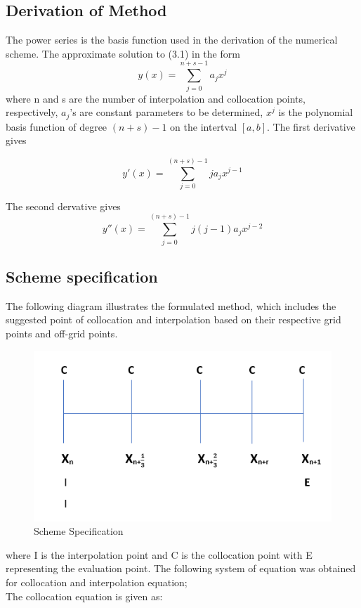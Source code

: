 \documentclass[12pt]{article}
\begin{document}
\subsection{Derivation of Method}
\noindent The power series is the basis function used in the derivation of the numerical scheme. The approximate solution to (3.1) in the form
	\begin{equation}
	y(x) = \sum_{j=0}^{n+s-1}a_{j}x^{j}								
	\end{equation}
	where n and s are the number of interpolation and collocation points, respectively, $a_j$'s are constant parameters to be determined, $x^j$ is the polynomial basis function of degree $(n+s)-1$ on the intertval $[a,b]$. The first derivative gives
	
	\begin{equation}
	y'(x)=\sum_{j=0}^{(n+s)-1} j a_{j}x^{j-1}
	\end{equation}
	
	The second dervative gives
	\begin{equation}
	y''(x)=\sum_{j=0}^{(n+s)-1} j(j-1) a_{j}x^{j-2}
	\end{equation}
	
\subsection{Scheme specification}
\noindent The following diagram illustrates the formulated method, which includes the suggested point of collocation and interpolation based on their respective grid points and off-grid points.

\begin{figure}[H]
	\centering
	\includegraphics[width=0.7\linewidth]{"proper scheme"}
	\caption{Scheme Specification}
	\label{fig:proper-scheme}
\end{figure}

\noindent where I is the interpolation point and C is the collocation point with E representing the evaluation point.
The following system of equation was obtained for collocation and  interpolation equation;\\
\noindent The collocation equation is given as:
\end{document}
